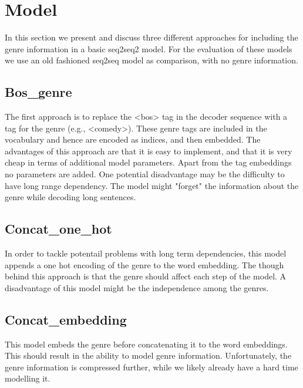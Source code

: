 \section{Model}

In this section we present and discuss three different approaches for including the genre information in a basic seq2seq2 model. For the evaluation of these models we use an old fashioned seq2seq model as comparison, with no genre information.

\subsection{Bos\_genre}
The first approach is to replace the <bos> tag in the decoder sequence with a tag for the genre (e.g., <comedy>). These genre tags are included in the vocabulary and hence are encoded as indices, and then embedded. The advantages of this approach are that it is easy to implement, and that it is very cheap in terms of additional model parameters. Apart from the tag embeddings no parameters are added. One potential disadvantage may be the difficulty to have long range dependency. The model might "forget" the information about the genre while decoding long sentences.

\subsection{Concat\_one\_hot}
In order to tackle potentail problems with long term dependencies, this model appends a one hot encoding of the genre to the word embedding. The though behind this approach is that the genre should affect each step of the model. A disadvantage of this model might be the independence among the genres.

\subsection{Concat\_embedding}
This model embeds the genre before concatenating it to the word embeddings. This should result in the ability to model genre information. Unfortunately, the genre information is compressed further, while we likely already have a hard time modelling it.
